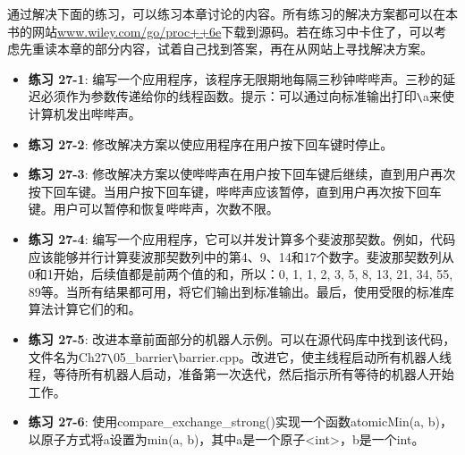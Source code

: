 通过解决下面的练习，可以练习本章讨论的内容。所有练习的解决方案都可以在本书的网站\url{www.wiley.com/go/proc++6e}下载到源码。若在练习中卡住了，可以考虑先重读本章的部分内容，试着自己找到答案，再在从网站上寻找解决方案。

\begin{itemize}
\item
\textbf{练习 27-1}: 编写一个应用程序，该程序无限期地每隔三秒钟哔哔声。三秒的延迟必须作为参数传递给你的线程函数。提示：可以通过向标准输出打印\verb|\|a来使计算机发出哔哔声。

\item
\textbf{练习 27-2}: 修改解决方案以使应用程序在用户按下回车键时停止。

\item
\textbf{练习 27-3}: 修改解决方案以使哔哔声在用户按下回车键后继续，直到用户再次按下回车键。当用户按下回车键，哔哔声应该暂停，直到用户再次按下回车键。用户可以暂停和恢复哔哔声，次数不限。

\item
\textbf{练习 27-4}: 编写一个应用程序，它可以并发计算多个斐波那契数。例如，代码应该能够并行计算斐波那契数列中的第4、9、14和17个数字。斐波那契数列从0和1开始，后续值都是前两个值的和，所以：0, 1, 1, 2, 3, 5, 8, 13, 21, 34, 55, 89等。当所有结果都可用，将它们输出到标准输出。最后，使用受限的标准库算法计算它们的和。

\item
\textbf{练习 27-5}: 改进本章前面部分的机器人示例。可以在源代码库中找到该代码，文件名为Ch27\verb|\|05\_barrier\verb|\|barrier.cpp。改进它，使主线程启动所有机器人线程，等待所有机器人启动，准备第一次迭代，然后指示所有等待的机器人开始工作。

\item
\textbf{练习 27-6}: 使用compare\_exchange\_strong()实现一个函数atomicMin(a, b)，以原子方式将a设置为min(a, b)，其中a是一个原子<int>，b是一个int。
\end{itemize}







